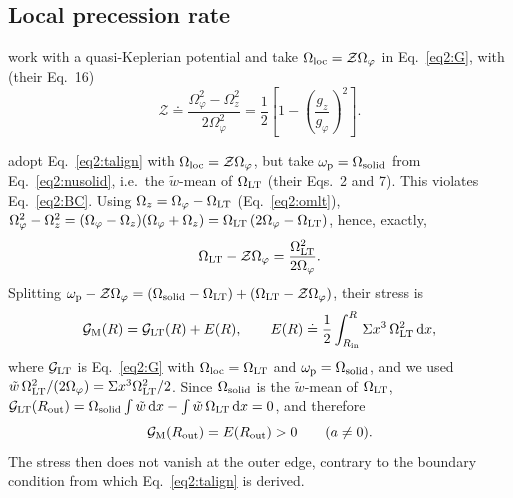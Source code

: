 \subsection{Local precession rate}
\label{appM:omloc}

\citet{FoucartLai2014} work with a quasi-Keplerian potential and take $\Omega_\textup{loc}=\mathcal{Z}\Omega_\varphi$ in Eq.~\eqref{eq2:G}, with (their Eq.~16)
\begin{equation}
    \label{eqM:Zdef}
    \mathcal{Z}\doteq\frac{\Omega_\varphi^2-\Omega_z^2}{2\Omega_\varphi^2}
    =\frac12\left[1-\left(\frac{g_z}{g_\varphi}\right)^{2}\right].
\end{equation}

\citet{Motta2017} adopt Eq.~\eqref{eq2:talign} with $\Omega_\textup{loc}=\mathcal{Z}\Omega_\varphi$, but take $\omega_\textup{p}=\Omega_\textup{solid}$ from Eq.~\eqref{eq2:nusolid}, i.e.\ the $\tilde w$-mean of $\Omega_\textup{LT}$ (their Eqs.~2 and 7).
This violates Eq.~\eqref{eq2:BC}.
Using $\Omega_z=\Omega_\varphi-\Omega_\textup{LT}$ (Eq.~\ref{eq2:omlt}), $\Omega_\varphi^2-\Omega_z^2=(\Omega_\varphi-\Omega_z)(\Omega_\varphi+\Omega_z)=\Omega_\textup{LT}\,(2\Omega_\varphi-\Omega_\textup{LT})$, hence, exactly,
\begin{equation}
    \label{eqM:LTminusZ}
    \Omega_\textup{LT}-\mathcal{Z}\Omega_\varphi=\frac{\Omega_\textup{LT}^2}{2\Omega_\varphi}.
\end{equation}
Splitting $\omega_\textup{p}-\mathcal{Z}\Omega_\varphi=(\Omega_\textup{solid}-\Omega_\textup{LT})+(\Omega_\textup{LT}-\mathcal{Z}\Omega_\varphi)$, their stress is
\begin{equation}
    \label{eqM:GM}
    \mathcal{G}_\textup{M}(R)=\mathcal{G}_\textup{LT}(R)+E(R),
    \qquad
    E(R)\doteq\frac12\int_{R_\textup{in}}^{R}\Sigma x^3\,\Omega_\textup{LT}^2\,\textup{d}x ,
\end{equation}
where $\mathcal{G}_\textup{LT}$ is Eq.~\eqref{eq2:G} with $\Omega_\textup{loc}=\Omega_\textup{LT}$ and $\omega_\textup{p}=\Omega_\textup{solid}$, and we used $\tilde w\,\Omega_\textup{LT}^2/(2\Omega_\varphi)=\Sigma x^3\Omega_\textup{LT}^2/2$.
Since $\Omega_\textup{solid}$ is the $\tilde w$-mean of $\Omega_\textup{LT}$, $\mathcal{G}_\textup{LT}(R_\textup{out})=\Omega_\textup{solid}\int\tilde w\,\textup{d}x-\int\tilde w\,\Omega_\textup{LT}\,\textup{d}x=0$, and therefore
\begin{equation}
    \label{eqM:GMout}
    \mathcal{G}_\textup{M}(R_\textup{out})=E(R_\textup{out})>0\qquad(a\neq0).
\end{equation}
The stress then does not vanish at the outer edge, contrary to the boundary condition from which Eq.~\eqref{eq2:talign} is derived.

